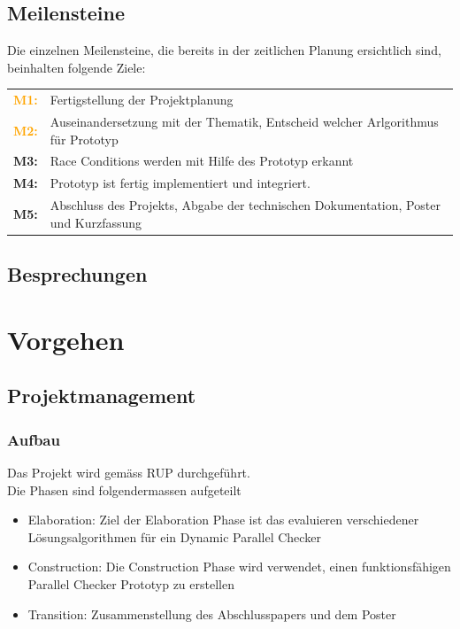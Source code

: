 \documentclass[10pt,a4paper]{article}
\begin{document}
\subsection{Meilensteine}
\begin{flushleft}
	Die einzelnen Meilensteine, die bereits in der zeitlichen Planung ersichtlich sind, beinhalten folgende Ziele:
\end{flushleft}
\begin{tabular}{cl}
	\textcolor{Orange}{\textbf{M1:}} & Fertigstellung der Projektplanung\\[0.2cm]
	\textcolor{Orange}{\textbf{M2:}} & Auseinandersetzung mit der Thematik, Entscheid welcher Arlgorithmus für Prototyp\\[0.2cm]
	\textcolor{NavyBlue}{\textbf{M3:}} & Race Conditions werden mit Hilfe des Prototyp erkannt\\[0.2cm]
	\textcolor{NavyBlue}{\textbf{M4:}} & Prototyp ist fertig implementiert und integriert.\\[0.2cm]
	\textcolor{Dandelion}{\textbf{M5:}} & Abschluss des Projekts, Abgabe der technischen Dokumentation, Poster und Kurzfassung\\
\end{tabular}
\subsection{Besprechungen}
\newpage
\section{Vorgehen}
\subsection{Projektmanagement}
\subsubsection{Aufbau}
Das Projekt wird gemäss RUP durchgeführt.\\
Die Phasen sind folgendermassen aufgeteilt\\
\begin{itemize}
	\item Elaboration: Ziel der Elaboration Phase ist das evaluieren verschiedener Lösungsalgorithmen für ein Dynamic Parallel Checker
	\item Construction: Die Construction Phase wird verwendet, einen funktionsfähigen Parallel Checker Prototyp zu erstellen
	\item Transition: Zusammenstellung des Abschlusspapers und dem Poster
\end{itemize}
\end{document}
